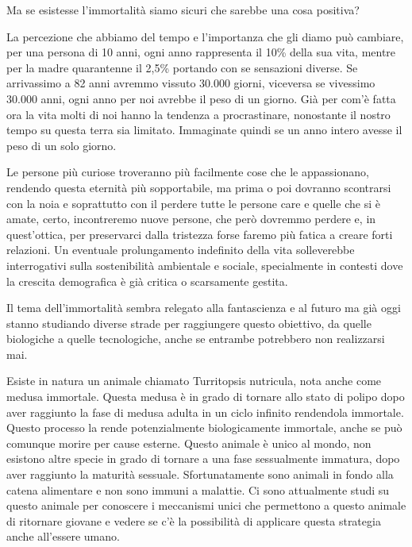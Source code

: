 \documentclass[12pt]{book} %
\begin{document}
Ma se esistesse l'immortalità siamo sicuri che sarebbe una cosa positiva?

La percezione che abbiamo del tempo e l'importanza che gli diamo può cambiare, per una persona
di 10 anni, ogni anno rappresenta il 10\% della sua vita, mentre per la madre quarantenne il 2,5\% portando con se
sensazioni diverse. Se arrivassimo a 82 anni avremmo vissuto 30.000 giorni, viceversa se vivessimo 30.000 anni, ogni
anno per noi avrebbe il peso di un giorno. Già per com'è fatta ora la vita molti di noi hanno la
tendenza a procrastinare, nonostante il nostro tempo su questa terra sia limitato. Immaginate quindi se un anno intero
avesse il peso di un solo giorno.

Le persone più curiose troveranno più facilmente cose che le appassionano, rendendo questa eternità più sopportabile, ma
prima o poi dovranno scontrarsi con la noia e soprattutto con il perdere tutte le persone care e quelle che si è amate,
certo, incontreremo nuove persone, che però dovremmo perdere e, in quest'ottica, per preservarci dalla tristezza forse faremo più fatica a creare forti relazioni. Un eventuale prolungamento indefinito della vita solleverebbe interrogativi sulla sostenibilità ambientale e sociale, specialmente in contesti dove la crescita demografica è già critica o scarsamente gestita.

Il tema dell'immortalità sembra relegato alla fantascienza e al futuro ma già oggi stanno studiando
diverse strade per raggiungere questo obiettivo, da quelle biologiche a quelle tecnologiche, anche se entrambe potrebbero non realizzarsi mai. 

Esiste in natura un animale chiamato Turritopsis nutricula, nota anche come medusa immortale. Questa medusa è in grado
di tornare allo stato di polipo dopo aver raggiunto la fase di medusa adulta in un ciclo infinito rendendola immortale.
Questo processo la rende potenzialmente biologicamente immortale, anche se può comunque morire per cause esterne.
Questo animale è unico al mondo, non esistono altre specie in grado di tornare a una fase sessualmente immatura, dopo
aver raggiunto la maturità sessuale. 
Sfortunatamente sono animali in fondo alla catena alimentare e non sono immuni a malattie. Ci sono attualmente studi su
questo animale per conoscere i meccanismi unici che permettono a questo animale di ritornare giovane e vedere se
c'è la possibilità di applicare questa strategia anche all'essere umano.
\end{document}
